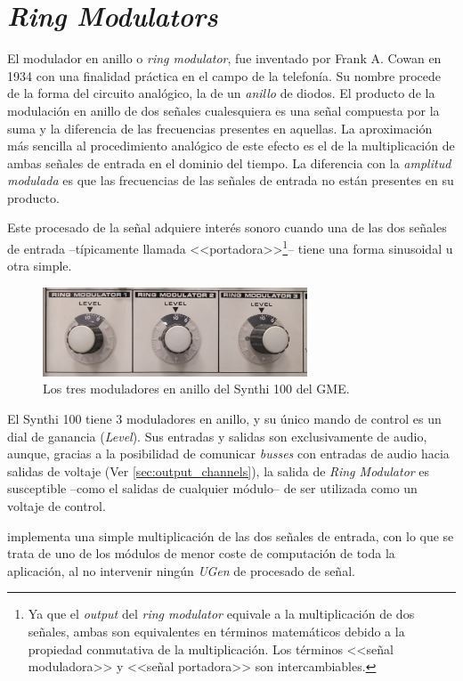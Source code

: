 \section[Ring Modulators]{\textit{Ring Modulators}}
\label{sec:ring_modulators}

El modulador en anillo o \textit{ring modulator}, fue inventado por Frank A. Cowan en 1934 con una finalidad práctica en el campo de la telefonía. Su nombre procede de la forma del circuito analógico, la de un \textit{anillo} de diodos. El producto de la modulación en anillo de dos señales cualesquiera es una señal compuesta por la suma y la diferencia de las frecuencias presentes en aquellas. La aproximación más sencilla al procedimiento analógico de este efecto es el de la multiplicación de ambas señales de entrada en el dominio del tiempo. La diferencia con la \textit{amplitud modulada} es que las frecuencias de las señales de entrada no están presentes en su producto. 

Este procesado de la señal adquiere interés sonoro cuando una de las dos señales de entrada --típicamente llamada <<portadora>>\footnote{Ya que el \textit{output} del \textit{ring modulator} equivale a la multiplicación de dos señales, ambas son equivalentes en términos matemáticos debido a la propiedad conmutativa de la multiplicación. Los términos <<señal moduladora>> y <<señal portadora>> son intercambiables.}-- tiene una forma sinusoidal u otra simple. 

\begin{figure}
	\centering
	\includegraphics[width=0.7\textwidth]{images/ring_modulators}
	\caption[\textit{Ring Modulators}]{Los tres moduladores en anillo del Synthi 100 del GME.}
	\label{fig:ring_modulators}
\end{figure}

El Synthi 100 tiene 3 moduladores en anillo, y su único mando de control es un dial de ganancia (\textit{Level}). Sus entradas y salidas son exclusivamente de audio, aunque, gracias a la posibilidad de comunicar \textit{busses} con entradas de audio hacia salidas de voltaje (Ver \ref{sec:output_channels}), la salida de \textit{Ring Modulator} es susceptible --como el salidas de cualquier módulo-- de ser utilizada como un voltaje de control.

\appName implementa una simple multiplicación de las dos señales de entrada, con lo que se trata de uno de los módulos de menor coste de computación de toda la aplicación, al no intervenir ningún \textit{UGen} de procesado de señal.
